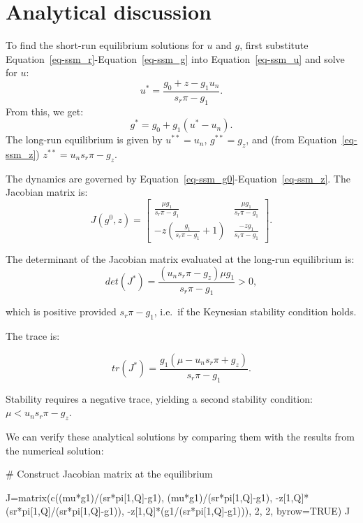 \documentclass[
  letterpaper,
  DIV=11,
  numbers=noendperiod]{scrreprt}
\newenvironment{Shaded}{\begin{snugshade}}{\end{snugshade}}
\newcommand{\AttributeTok}[1]{\textcolor[rgb]{0.40,0.45,0.13}{#1}}
\newcommand{\CommentTok}[1]{\textcolor[rgb]{0.37,0.37,0.37}{#1}}
\newcommand{\ConstantTok}[1]{\textcolor[rgb]{0.56,0.35,0.01}{#1}}
\newcommand{\DecValTok}[1]{\textcolor[rgb]{0.68,0.00,0.00}{#1}}
\newcommand{\FunctionTok}[1]{\textcolor[rgb]{0.28,0.35,0.67}{#1}}
\newcommand{\NormalTok}[1]{\textcolor[rgb]{0.00,0.23,0.31}{#1}}
\newcommand{\OtherTok}[1]{\textcolor[rgb]{0.00,0.23,0.31}{#1}}
\newcommand{\SpecialCharTok}[1]{\textcolor[rgb]{0.37,0.37,0.37}{#1}}
\begin{document}
\section{Analytical discussion}\label{analytical-discussion-6}

To find the short-run equilibrium solutions for \(u\) and \(g\), first
substitute Equation~\ref{eq-ssm_r}-Equation~\ref{eq-ssm_g} into
Equation~\ref{eq-ssm_u} and solve for \(u\): \[
u^* = \frac{g_0+z-g_1u_n}{s_r \pi-g_1}.
\] From this, we get: \[
g^* = g_0 + g_1(u^* - u_n).
\] The long-run equilibrium is given by \(u^{**}=u_n\), \(g^{**}=g_z\),
and (from Equation~\ref{eq-ssm_z}) \(z^{**}=u_n s_r \pi - g_z\).

The dynamics are governed by
Equation~\ref{eq-ssm_g0}-Equation~\ref{eq-ssm_z}. The Jacobian matrix
is: \[
J(g^0, z)=\begin{bmatrix} \frac{\mu g_1}{s_r\pi-g_1}& \frac{\mu g_1}{s_r\pi-g_1} \\ -z(\frac{g_1}{s_r\pi-g_1} +1)& \frac{-zg_1}{s_r\pi-g_1} \end{bmatrix}.
\]

The determinant of the Jacobian matrix evaluated at the long-run
equilibrium is: \[
det(J^*) = \frac{(u_n s_r \pi - g_z)\mu g_1}{s_r\pi-g_1} > 0,
\]

which is positive provided \(s_r\pi-g_1\), i.e.~if the Keynesian
stability condition holds.

The trace is:

\[
tr(J^*) = \frac{g_1(\mu-u_n s_r \pi + g_z)}{s_r\pi-g_1}.
\]

Stability requires a negative trace, yielding a second stability
condition: \(\mu<u_n s_r \pi - g_z\).

We can verify these analytical solutions by comparing them with the
results from the numerical solution:

\begin{Shaded}
\begin{Highlighting}[]
\CommentTok{\# Construct Jacobian matrix at the equilibrium }

\NormalTok{J}\OtherTok{=}\FunctionTok{matrix}\NormalTok{(}\FunctionTok{c}\NormalTok{((mu}\SpecialCharTok{*}\NormalTok{g1)}\SpecialCharTok{/}\NormalTok{(sr}\SpecialCharTok{*}\NormalTok{pi[}\DecValTok{1}\NormalTok{,Q]}\SpecialCharTok{{-}}\NormalTok{g1), (mu}\SpecialCharTok{*}\NormalTok{g1)}\SpecialCharTok{/}\NormalTok{(sr}\SpecialCharTok{*}\NormalTok{pi[}\DecValTok{1}\NormalTok{,Q]}\SpecialCharTok{{-}}\NormalTok{g1),}
           \SpecialCharTok{{-}}\NormalTok{z[}\DecValTok{1}\NormalTok{,Q]}\SpecialCharTok{*}\NormalTok{(sr}\SpecialCharTok{*}\NormalTok{pi[}\DecValTok{1}\NormalTok{,Q]}\SpecialCharTok{/}\NormalTok{(sr}\SpecialCharTok{*}\NormalTok{pi[}\DecValTok{1}\NormalTok{,Q]}\SpecialCharTok{{-}}\NormalTok{g1)), }\SpecialCharTok{{-}}\NormalTok{z[}\DecValTok{1}\NormalTok{,Q]}\SpecialCharTok{*}\NormalTok{(g1}\SpecialCharTok{/}\NormalTok{(sr}\SpecialCharTok{*}\NormalTok{pi[}\DecValTok{1}\NormalTok{,Q]}\SpecialCharTok{{-}}\NormalTok{g1))), }\DecValTok{2}\NormalTok{, }\DecValTok{2}\NormalTok{, }\AttributeTok{byrow=}\ConstantTok{TRUE}\NormalTok{)}
\NormalTok{J}
\end{Highlighting}
\end{Shaded}
\end{document}
